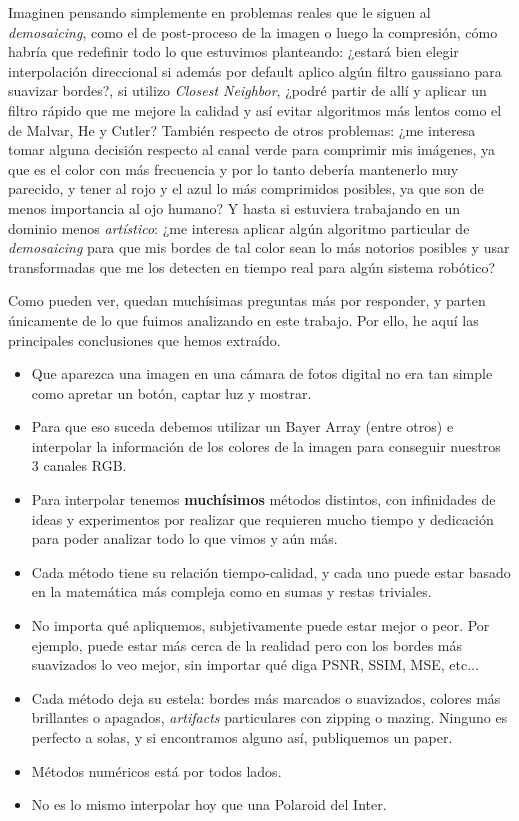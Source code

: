 Imaginen pensando simplemente en problemas reales que le siguen al \textit{demosaicing}, como el de post-proceso de la imagen o luego la compresión, cómo habría que redefinir todo lo que estuvimos planteando: ¿estará bien elegir interpolación direccional si además por default aplico algún filtro gaussiano para suavizar bordes?, si utilizo \textit{Closest Neighbor}, ¿podré partir de allí y aplicar un filtro rápido que me mejore la calidad y así evitar algoritmos más lentos como el de Malvar, He y Cutler? También respecto de otros problemas: ¿me interesa tomar alguna decisión respecto al canal verde para comprimir mis imágenes, ya que es el color con más frecuencia y por lo tanto debería mantenerlo muy parecido, y tener al rojo y el azul lo más comprimidos posibles, ya que son de menos importancia al ojo humano? Y hasta si estuviera trabajando en un dominio menos \textit{artístico}: ¿me interesa aplicar algún algoritmo particular de \textit{demosaicing} para que mis bordes de tal color sean lo más notorios posibles y usar transformadas que me los detecten en tiempo real para algún sistema robótico?

Como pueden ver, quedan muchísimas preguntas más por responder, y parten únicamente de lo que fuimos analizando en este trabajo. Por ello, he aquí las principales conclusiones que hemos extraído. 

\vspace{\baselineskip}

\begin{itemize}
\item Que aparezca una imagen en una cámara de fotos digital no era tan simple como apretar un botón, captar luz y mostrar.
\item Para que eso suceda debemos utilizar un Bayer Array (entre otros) e interpolar la información de los colores de la imagen para conseguir nuestros 3 canales RGB.
\item Para interpolar tenemos \textbf{muchísimos} métodos distintos, con infinidades de ideas y experimentos por realizar que requieren mucho tiempo y dedicación para poder analizar todo lo que vimos y aún más.
\item Cada método tiene su relación tiempo-calidad, y cada uno puede estar basado en la matemática más compleja como en sumas y restas triviales.
\item No importa qué apliquemos, subjetivamente puede estar mejor o peor. Por ejemplo, puede estar más cerca de la realidad pero con los bordes más suavizados lo veo mejor, sin importar qué diga PSNR, SSIM, MSE, etc...
\item Cada método deja su estela: bordes más marcados o suavizados, colores más brillantes o apagados, \textit{artifacts} particulares con zipping o mazing. Ninguno es perfecto a solas, y si encontramos alguno así, publiquemos un paper.
\item Métodos numéricos está por todos lados.
\item No es lo mismo interpolar hoy que una Polaroid del Inter.
\end{itemize}

